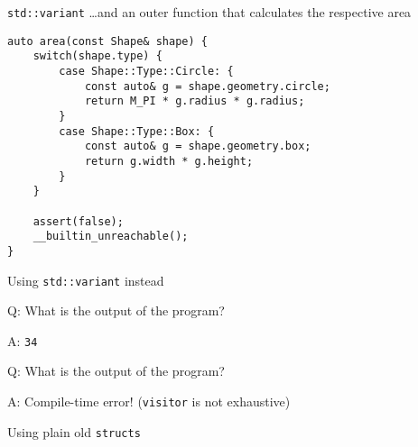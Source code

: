 \begin{frame}[fragile]{\texttt{std::variant}}
    \ldots and an outer function that calculates the respective area
    \begin{lstlisting}
auto area(const Shape& shape) {
    switch(shape.type) {
        case Shape::Type::Circle: {
            const auto& g = shape.geometry.circle;
            return M_PI * g.radius * g.radius;
        }
        case Shape::Type::Box: {
            const auto& g = shape.geometry.box;
            return g.width * g.height;
        }
    }

    assert(false);
    __builtin_unreachable();
}
    \end{lstlisting}
\end{frame}

\begin{frame}
\end{frame}

\begin{frame}[fragile]{Using \texttt{std::variant} instead}
\end{frame}

\begin{frame}
    \centering
    \scalebox{8.}{\}}
\end{frame}

\begin{frame}[fragile]{Q: What is the output of the program?}
\end{frame}

\addtocounter{framenumber}{-1}
\begin{frame}[fragile]{A: \texttt{34}}
\end{frame}

\begin{frame}[fragile]{Q: What is the output of the program?}
\end{frame}

\addtocounter{framenumber}{-1}
\begin{frame}[fragile]{A: Compile-time error! (\texttt{visitor} is not exhaustive)}
\end{frame}

\begin{frame}[fragile]{Using plain old \texttt{structs}}
\end{frame}

